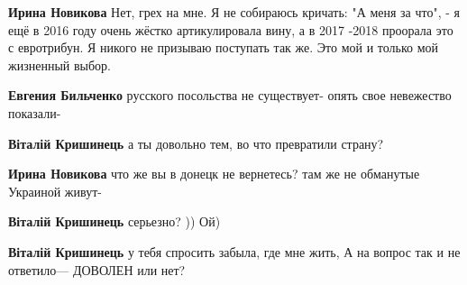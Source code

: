 \begin{itemize}
\begin{itemize}
 
\textbf{Ирина Новикова} Нет, грех на мне. Я не собираюсь кричать: "А меня за что", - я ещё в 2016 году очень жёстко артикулировала вину, а в 2017 -2018 проорала это с евротрибун. Я никого не призываю поступать так же. Это мой и только мой жизненный выбор.

 
\textbf{Евгения Бильченко} русского посольства не существует- опять свое невежество показали-

 
\textbf{Віталій Кришинець} а ты довольно тем, во что превратили страну?

 
\textbf{Ирина Новикова} что же вы в донецк не вернетесь? там же не обманутые Украиной живут-

 
\textbf{Віталій Кришинець} серьезно? )) Ой)

 
\textbf{Віталій Кришинець} у тебя спросить забыла, где мне жить, А на вопрос так и не ответило— ДОВОЛЕН или нет?


\end{itemize}
\end{itemize}
